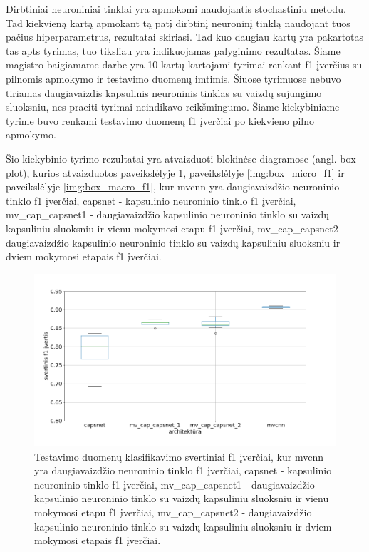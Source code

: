Dirbtiniai neuroniniai tinklai yra apmokomi naudojantis stochastiniu metodu. Tad kiekvieną kartą apmokant tą patį dirbtinį neuroninį tinklą naudojant tuos pačius hiperparametrus, rezultatai skiriasi. Tad kuo daugiau kartų yra pakartotas tas apts tyrimas, tuo tiksliau yra indikuojamas palyginimo rezultatas. Šiame magistro baigiamame darbe yra 10 kartų kartojami tyrimai renkant f1 įverčius su pilnomis apmokymo ir testavimo duomenų imtimis. Šiuose tyrimuose nebuvo tiriamas daugiavaizdis kapsulinis neuroninis tinklas su vaizdų sujungimo sluoksniu, nes praeiti tyrimai neindikavo reikšmingumo. Šiame kiekybiniame tyrime buvo renkami testavimo duomenų f1 įverčiai po kiekvieno pilno apmokymo.


Šio kiekybinio tyrimo rezultatai yra atvaizduoti blokinėse diagramose (angl. box plot), kurios atvaizduotos paveikslėlyje \ref{img:box_weighted_f1}, paveikslėlyje \ref{img:box_micro_f1} ir  paveikslėlyje \ref{img:box_macro_f1}, kur
mvcnn yra daugiavaizdžio neuroninio tinklo f1 įverčiai, capsnet - kapsulinio neuroninio tinklo f1 įverčiai, mv\_cap\_capsnet1 - daugiavaizdžio kapsulinio neuroninio tinklo su vaizdų kapsuliniu sluoksniu ir vienu mokymosi etapu f1 įverčiai, mv\_cap\_capsnet2 - daugiavaizdžio kapsulinio neuroninio tinklo su vaizdų kapsuliniu sluoksniu ir dviem mokymosi etapais f1 įverčiai.

\begin{figure}[H]
	\centering
	\includegraphics[scale=0.4]{img/boxplot_f1_weighted.png}
	\caption{
		Testavimo duomenų klasifikavimo svertiniai f1 įverčiai, kur mvcnn yra daugiavaizdžio neuroninio tinklo f1 įverčiai, capsnet - kapsulinio neuroninio tinklo f1 įverčiai, mv\_cap\_capsnet1 - daugiavaizdžio kapsulinio neuroninio tinklo su vaizdų kapsuliniu sluoksniu ir vienu mokymosi etapu f1 įverčiai, mv\_cap\_capsnet2 - daugiavaizdžio kapsulinio neuroninio tinklo su vaizdų kapsuliniu sluoksniu ir dviem mokymosi etapais f1 įverčiai.
	}
	\label{img:box_weighted_f1}
\end{figure}

